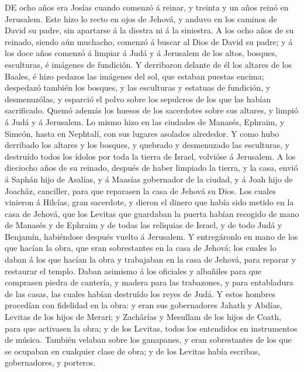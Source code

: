  DE ocho años era Josías cuando comenzó á reinar, y
treinta y un años reinó en Jerusalem.  Este hizo lo recto
en ojos de Jehová, y anduvo en los caminos de David su padre, sin
apartarse á la diestra ni á la siniestra.  A los ocho años
de su reinado, siendo aún muchacho, comenzó á buscar al Dios de David su
padre; y á los doce años comenzó á limpiar á Judá y á Jerusalem de los
altos, bosques, esculturas, é imágenes de fundición.  Y
derribaron delante de él los altares de los Baales, é hizo pedazos las
imágenes del sol, que estaban puestas encima; despedazó también los
bosques, y las esculturas y estatuas de fundición, y desmenuzólas, y
esparció el polvo sobre los sepulcros de los que las habían sacrificado.
 Quemó además los huesos de los sacerdotes sobre sus
altares, y limpió á Judá y á Jerusalem.  Lo mismo hizo en
las ciudades de Manasés, Ephraim, y Simeón, hasta en Nephtalí, con sus
lugares asolados alrededor.  Y como hubo derribado los
altares y los bosques, y quebrado y desmenuzado las esculturas, y
destruído todos los ídolos por toda la tierra de Israel, volvióse á
Jerusalem.  A los dieciocho años de su reinado, después de
haber limpiado la tierra, y la casa, envió á Saphán hijo de Asalías, y á
Maasías gobernador de la ciudad, y á Joah hijo de Joachâz, canciller,
para que reparasen la casa de Jehová su Dios.  Los cuales
vinieron á Hilcías, gran sacerdote, y dieron el dinero que había sido
metido en la casa de Jehová, que los Levitas que guardaban la puerta
habían recogido de mano de Manasés y de Ephraim y de todas las reliquias
de Israel, y de todo Judá y Benjamín, habiéndose después vuelto á
Jerusalem.  Y entregáronlo en mano de los que hacían la
obra, que eran sobrestantes en la casa de Jehová; los cuales lo daban á
los que hacían la obra y trabajaban en la casa de Jehová, para reparar y
restaurar el templo.  Daban asimismo á los oficiales y
albañiles para que comprasen piedra de cantería, y madera para las
trabazones, y para entabladura de las casas, las cuales habían destruído
los reyes de Judá.  Y estos hombres procedían con
fidelidad en la obra: y eran sus gobernadores Jahath y Abdías, Levitas
de los hijos de Merari; y Zachârías y Mesullam de los hijos de Coath,
para que activasen la obra; y de los Levitas, todos los entendidos en
instrumentos de música.  También velaban sobre los
ganapanes, y eran sobrestantes de los que se ocupaban en cualquier clase
de obra; y de los Levitas había escribas, gobernadores, y porteros.
